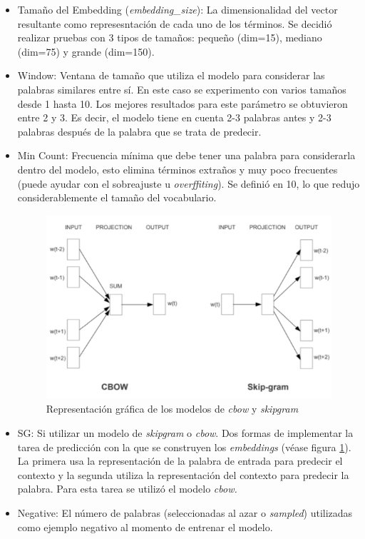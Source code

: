 \begin{itemize}
    \item Tamaño del Embedding (\textit{embedding\_size}): La dimensionalidad del vector resultante como represesntación de cada uno de los términos. Se decidió realizar pruebas con 3 tipos de tamaños: pequeño (dim=15), mediano (dim=75) y grande (dim=150).
    
    \item Window: Ventana de tamaño que utiliza el modelo para considerar las palabras similares entre sí. En este caso se experimento con varios tamaños desde 1 hasta 10. Los mejores resultados para este parámetro se obtuvieron entre 2 y 3. Es decir, el modelo tiene en cuenta 2-3 palabras antes y 2-3 palabras después de la palabra que se trata de predecir.
    
    \item Min Count: Frecuencia mínima que debe tener una palabra para considerarla dentro del modelo, esto elimina términos extraños y muy poco frecuentes (puede ayudar con el sobreajuste u \textit{overffiting}). Se definió en 10, lo que redujo considerablemente el tamaño del vocabulario.
    
    \begin{figure}[H]
        \centering
        \includegraphics[scale=0.72]{doc/images/cbow_skipgram.png}
        \caption{Representación gráfica de los modelos de \textit{cbow} y \textit{skipgram}}
        \label{fig:cbow_skipgram}
    \end{figure}
    
    \item SG: Si utilizar un modelo de \textit{skipgram} o \textit{cbow}. Dos formas de implementar la tarea de predicción con la que se construyen los \textit{embeddings} (véase figura \ref{fig:cbow_skipgram}). La primera usa la representación de la palabra de entrada para predecir el contexto y la segunda utiliza la representación del contexto para predecir la palabra. Para esta tarea se utilizó el modelo \textit{cbow.}
    
    \item Negative: El número de palabras (seleccionadas al azar o \textit{sampled}) utilizadas como ejemplo negativo al momento de entrenar el modelo.
    
\end{itemize}

